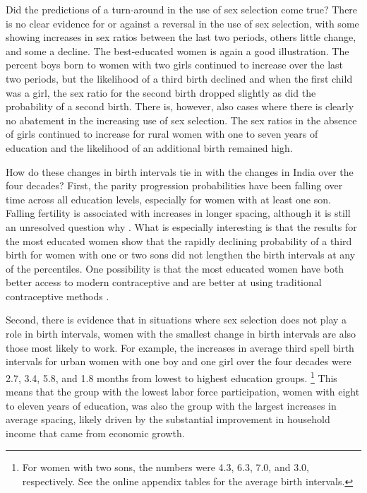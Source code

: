 \documentclass[12pt,letterpaper]{article}
\begin{document}
Did the predictions of a turn-around in the use of sex selection come true?
There is no clear evidence for or against a reversal in the use of sex selection, with 
some showing increases in sex ratios between the last two periods, others little change, 
and some a decline.
The best-educated women is again a good illustration.
The percent boys born to women with two girls continued to increase over the last two
periods, but the likelihood of a third birth declined and when the first child was a girl, 
the sex ratio for the second birth dropped slightly as did the probability of a second birth. 
There is, however, also cases where there is clearly no abatement in the increasing use of 
sex selection. 
The sex ratios in the absence of girls continued to increase for rural women with
one to seven years of education and the likelihood of an additional birth remained high.


How do these changes in birth intervals tie in with the changes in India over the four
decades?
First, the parity progression probabilities have been falling over time across all 
education levels, especially for women with at least one son.
Falling fertility is associated with increases in longer spacing, although it is still an 
unresolved question why \citep{Casterline2016}.
What is especially interesting is that the results for the most educated women show that 
the rapidly declining probability of a third birth for women with one or two sons did not 
lengthen the birth intervals at any of the percentiles.
One possibility is that the most educated women have both better access to modern
contraceptive and are better at using traditional contraceptive methods 
\citep{Rosenzweig1989}.

Second, there is evidence that in situations where sex selection does not play a role 
in birth intervals, women with the smallest change in birth intervals are also those most 
likely to work.
For example, the increases in average third spell birth intervals for urban women with
one boy and one girl over the four decades were 2.7, 3.4, 5.8, and 1.8 months from lowest 
to highest education groups.%
\footnote{
For women with two sons, the numbers were 4.3, 6.3, 7.0, and 3.0, respectively.
See the online appendix tables for the average birth intervals.
}
This means that the group with the lowest labor force participation, women with eight to 
eleven years of education, was also the group with the largest increases in average 
spacing, likely driven by the substantial improvement in household income that came
from economic growth.
\end{document}
